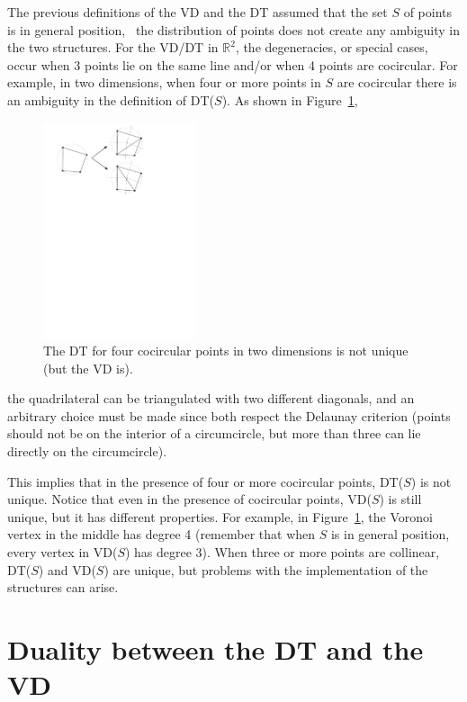 The previous definitions of the VD and the DT assumed that the set $S$ of points is in general position, \ie\ the distribution of points does not create any ambiguity in the two structures. 
For the VD/DT in $\mathbb{R}^{2}$, the degeneracies, or special cases, occur when 3 points lie on the same line and/or when 4 points are cocircular. 
For example, in two dimensions, when four or more points in $S$ are cocircular there is an ambiguity in the definition of DT($S$). 
As shown in Figure~\ref{fig:degeneracies},
\begin{figure}
  \centering
  \includegraphics[width=0.4\textwidth]{figs/degeneracies}
  \caption{The DT for four cocircular points in two dimensions is not unique (but the VD is).}
\label{fig:degeneracies}
\end{figure}
the quadrilateral can be triangulated with two different diagonals, and an arbitrary choice must be made since both respect the Delaunay criterion (points should not be on the interior of a circumcircle, but more than three can lie directly on the circumcircle).

This implies that in the presence of four or more cocircular points, DT($S$) is not unique. 
Notice that even in the presence of cocircular points, VD($S$) is still unique, but it has different properties. 
For example, in Figure~\ref{fig:degeneracies}, the Voronoi vertex in the middle has degree 4 (remember that when $S$ is in general position, every vertex in VD($S$) has degree 3). 
When three or more points are collinear, DT($S$) and VD($S$) are unique, but problems with the implementation of the structures can arise.


%
\section{Duality between the DT and the VD}
\label{sec:duality}

